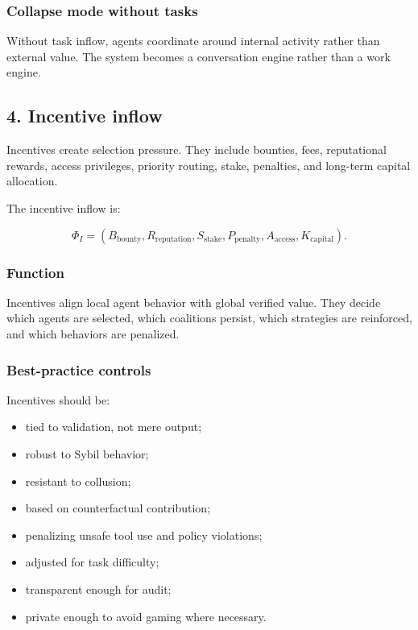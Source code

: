 \documentclass[11pt]{article}
\providecommand{\tightlist}{\setlength{\itemsep}{0pt}\setlength{\parskip}{0pt}}
\begin{document}
\subsubsection{Collapse mode without tasks}\label{collapse-mode-without-tasks}

Without task inflow, agents coordinate around internal activity rather than external value. The system becomes a conversation engine rather than a work engine.

\subsection{4. Incentive inflow}\label{incentive-inflow}

Incentives create selection pressure. They include bounties, fees, reputational rewards, access privileges, priority routing, stake, penalties, and long-term capital allocation.

The incentive inflow is:

\[
\Phi_I=(B_{\text{bounty}},R_{\text{reputation}},S_{\text{stake}},P_{\text{penalty}},A_{\text{access}},K_{\text{capital}}).
\]

\subsubsection{Function}\label{function-3}

Incentives align local agent behavior with global verified value. They decide which agents are selected, which coalitions persist, which strategies are reinforced, and which behaviors are penalized.

\subsubsection{Best-practice controls}\label{best-practice-controls-3}

Incentives should be:

\begin{itemize}
\tightlist
\item
  tied to validation, not mere output;
\item
  robust to Sybil behavior;
\item
  resistant to collusion;
\item
  based on counterfactual contribution;
\item
  penalizing unsafe tool use and policy violations;
\item
  adjusted for task difficulty;
\item
  transparent enough for audit;
\item
  private enough to avoid gaming where necessary.
\end{itemize}
\end{document}
